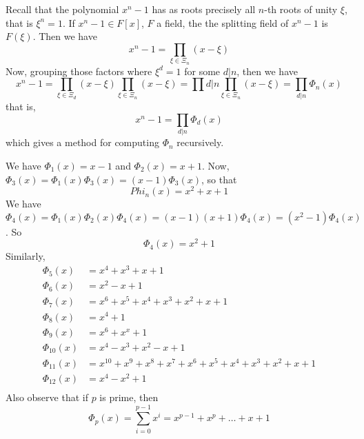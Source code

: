 \begin{example}\label{8.18}
  Recall that the polynomial $x^n-1$ has as roots precisely all  $n$-th roots
  of unity  $\xi$, that is $\xi^n=1$. If $x^n-1 \in F[x]$, $F$ a field, the
  the splitting field of  $x^n-1$ is  $F(\xi)$. Then we have
  \begin{equation*}
    x^n-1=\prod_{\xi \in \Xi_n}{(x-\xi)}
  \end{equation*}
  Now, grouping those factors where $\xi^d=1$ for some  $d|n$, then we have
  \begin{equation*}
    x^n-1=\prod_{\xi \in \Xi_d}{(x-\xi)}\prod_{\xi \in \Xi_n}{(x-\xi)}=
    \prod{d|n}{\prod_{\xi \in \Xi_n}{(x-\xi)}}=\prod_{d|n}{\Phi_n(x)}
  \end{equation*}
  that is,
  \begin{equation*}
    x^n-1=\prod_{d|n}{\Phi_d(x)}
  \end{equation*}
  which gives a method for computing $\Phi_n$ recursively.

  We have  $\Phi_1(x)=x-1$ and $\Phi_2(x)=x+1$. Now,
  $\Phi_3(x)=\Phi_1(x)\Phi_3(x)=(x-1)\Phi_3(x)$, so that
  \begin{equation*}
    Phi_n(x)=x^2+x+1
  \end{equation*}
  We have
  $\Phi_4(x)=\Phi_1(x)\Phi_2(x)\Phi_4(x)=(x-1)(x+1)\Phi_4(x)=(x^2-1)\Phi_4(x)$.
  So
  \begin{equation*}
    \Phi_4(x)=x^2+1
  \end{equation*}
  Similarly,
  \begin{align*}
    \Phi_5(x)   &=  x^4+x^3+x+1 \\
    \Phi_6(x)   &=  x^2-x+1 \\
    \Phi_7(x)   &=  x^6+x^5+x^4+x^3+x^2+x+1 \\
    \Phi_8(x)   &= x^4+1    \\
    \Phi_9(x)   &=  x^6+x^x+1   \\
    \Phi_{10}(x)   &=   x^4-x^3+x^2-x+1 \\
    \Phi_{11}(x)   &=   x^{10}+x^9+x^8+x^7+x^6+x^5+x^4+x^3+x^2+x+1  \\
    \Phi_{12}(x)   &=   x^4-x^2+1   \\
  \end{align*}
  Also observe that if $p$ is prime, then
  \begin{equation*}
    \Phi_p(x)=\sum_{i=0}^{p-1}{x^i}=x^{p-1}+x^p+\dots+x+1
  \end{equation*}
\end{example}

